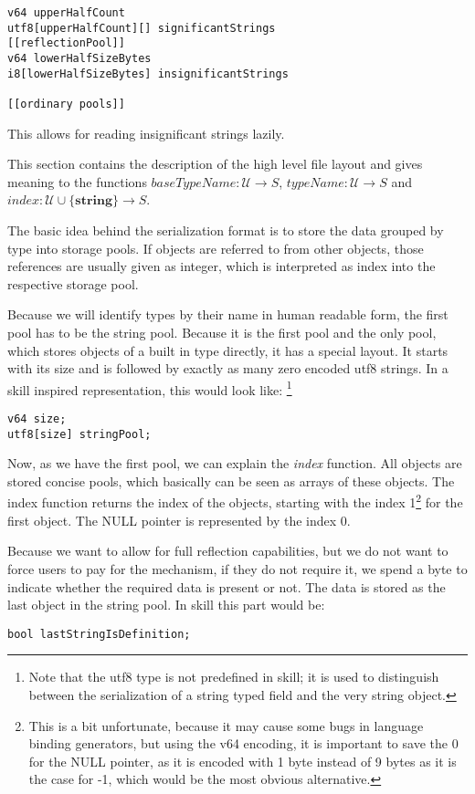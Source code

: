 \begin{verbatim}
v64 upperHalfCount
utf8[upperHalfCount][] significantStrings
[[reflectionPool]]
v64 lowerHalfSizeBytes
i8[lowerHalfSizeBytes] insignificantStrings

[[ordinary pools]]
\end{verbatim}
This allows for reading insignificant strings lazily.



This section contains the description of the high level file layout and gives meaning to the functions $baseTypeName: \mathcal{U} → S$, $typeName: \mathcal{U} → S$ and $index: \mathcal{U}\cup\{\textbf{string}\} → S$.

The basic idea behind the serialization format is to store the data grouped by type into storage pools. If objects are referred to from other objects, those references are usually given as integer, which is interpreted as index into the respective storage pool.

Because we will identify types by their name in human readable form, the first pool has to be the string pool. Because it is the first pool and the only pool, which stores objects of a built in type directly, it has a special layout. It starts with its size and is followed by exactly as many zero encoded utf8 strings. In a \gls{skill} inspired representation, this would look like: \footnote{Note that the utf8 type is not predefined in skill; it is used to distinguish between the serialization of a string typed field and the very string object.}
\begin{verbatim}
v64 size;
utf8[size] stringPool;
\end{verbatim}

Now, as we have the first pool, we can explain the \textit{index} function. All objects are stored concise pools, which basically can be seen as arrays of these objects. The index function returns the index of the objects, starting with the index 1\footnote{This is a bit unfortunate, because it may cause some bugs in language binding generators, but using the v64 encoding, it is important to save the 0 for the NULL pointer, as it is encoded with 1 byte instead of 9 bytes as it is the case for -1, which would be the most obvious alternative.} for the first object. The NULL pointer is represented by the index 0.

Because we want to allow for full reflection capabilities, but we do not want to force users to pay for the mechanism, if they do not require it, we spend a byte to indicate whether the required data is present or not. The data is stored as the last object in the string pool. In skill this part would be:
\begin{verbatim}
bool lastStringIsDefinition;
\end{verbatim}

